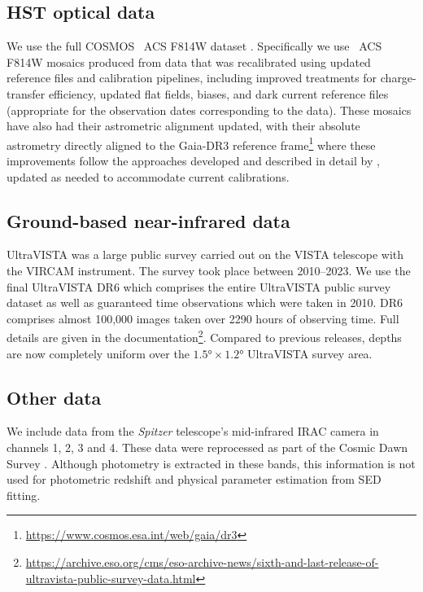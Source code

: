\documentclass[longauth]{aa}
\begin{document}
\subsection{HST optical data}
\label{sec:HST-data}
We use the full COSMOS \hst\ ACS F814W dataset \citep{Koekemoer2007}. Specifically we use \hst\ ACS F814W mosaics produced from data that was recalibrated using updated reference files and calibration pipelines, including improved treatments for charge-transfer efficiency, updated flat fields, biases, and dark current reference files (appropriate for the observation dates corresponding to the data). These mosaics have also had their astrometric alignment updated, with their absolute astrometry directly aligned to the Gaia-DR3 reference frame\footnote{\url{https://www.cosmos.esa.int/web/gaia/dr3}} where these improvements follow the approaches developed and described in detail by \citet{Koekemoer2011}, updated as needed to accommodate current calibrations.


\subsection{Ground-based near-infrared data}
\label{sec:ground-NIR}
UltraVISTA \citep{mccracken_ultravista_2012} was a large public survey carried out on the VISTA \citep{2015A&A...575A..25S} telescope with the VIRCAM \citep{2006SPIE.6269E..0XD} instrument.  The survey took place between 2010--2023. We use the final UltraVISTA DR6 which comprises the entire UltraVISTA public survey dataset as well as guaranteed time observations which were taken in 2010. DR6 comprises almost 100,000 images taken over 2290 hours of observing time. Full details are given in the documentation\footnote{\url{https://archive.eso.org/cms/eso-archive-news/sixth-and-last-release-of-ultravista-public-survey-data.html}}. Compared to previous releases, depths are now completely uniform over the $\ang{1.5}\times\ang{1.2}$ UltraVISTA survey area. 


\subsection{Other data}
\label{sec:IRAC}
We include data from the \textit{Spitzer} telescope's mid-infrared \citep{Werner2004} IRAC camera in channels 1, 2, 3 and  4. These data were reprocessed as part of the Cosmic Dawn Survey \citep[DAWN][]{McPartland2025, moneti_euclid_2021}. 
Although photometry is extracted in these bands, this information is not used for photometric redshift and physical parameter estimation from SED fitting.
\end{document}
